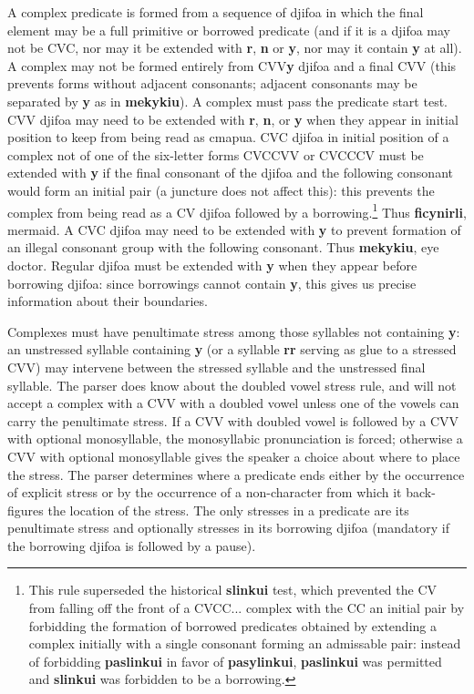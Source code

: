 \documentclass[12pt]{book}
\begin{document}
{A complex predicate is formed from a sequence of djifoa in which the final element may be a full primitive or borrowed predicate (and if it is a djifoa may not be CVC, nor may it be extended with {\bf r}, {\bf n} or {\bf y}, nor may it contain {\bf y} at all).   A complex may not be formed entirely from CVV{\bf y} djifoa and a final CVV (this prevents forms without adjacent consonants;  adjacent consonants may be separated by {\bf y} as in {\bf mekykiu}).  A complex must pass the predicate start test.
CVV djifoa may need to be extended with {\bf r}, {\bf n}, or {\bf y} when they appear in initial position to keep from being read as cmapua.  CVC djifoa in initial position of a complex not of one of the six-letter forms CVCCVV or CVCCCV must
be extended with {\bf y} if the final consonant of the djifoa and the following consonant would form an initial pair (a juncture does not affect this):  this prevents the complex
from being read as a CV djifoa followed by a borrowing.\footnote{This rule superseded the historical {\bf slinkui} test, which prevented the CV from falling off the front of a CVCC... complex with the CC an initial pair by forbidding the formation of borrowed predicates obtained by extending a complex initially with a single consonant forming an admissable pair:  instead of forbidding {\bf paslinkui} in favor of {\bf pasylinkui}, {\bf paslinkui} was permitted and {\bf slinkui} was forbidden to be a borrowing.}  Thus {\bf ficynirli}, mermaid.  A CVC djifoa may need to be extended with {\bf y} to prevent formation of an illegal consonant group with the following consonant.   Thus {\bf mekykiu}, eye doctor.  Regular djifoa must be extended with {\bf y} when they appear before borrowing djifoa:  since borrowings cannot contain {\bf y}, this gives us precise information about their boundaries.

Complexes must have penultimate stress among those syllables not containing {\bf y}:  an unstressed syllable containing {\bf y} (or a syllable {\bf rr} serving as glue to a stressed CVV) may intervene between the stressed syllable and the unstressed final syllable.  The parser does know about the doubled vowel stress rule, and will not accept a complex with a CVV with a doubled vowel unless one of the vowels can carry the penultimate stress.  If a CVV with doubled vowel is followed by a CVV with optional monosyllable, the monosyllabic pronunciation is forced;  otherwise a CVV with optional monosyllable gives the speaker a choice about where to place the stress.  The parser determines where a predicate ends either by the occurrence of explicit stress or by the occurrence of a non-character from which it back-figures the location of the stress.  The only stresses in a predicate are its penultimate stress and optionally stresses in its borrowing djifoa (mandatory if the borrowing djifoa is followed by a pause).

}
\end{document}

